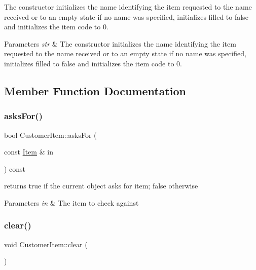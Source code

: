 The constructor initializes the name identifying the item requested to the name received or to an empty state if no name was specified, initializes filled to false and initializes the item code to 0. 
\begin{DoxyParams}{Parameters}
{\em str} & The constructor initializes the name identifying the item requested to the name received or to an empty state if no name was specified, initializes filled to false and initializes the item code to 0. \\
\hline
\end{DoxyParams}


\subsection{Member Function Documentation}
\mbox{\label{class_customer_item_a6275dac4b75e3cd8e56f504140cd135d}} 
\subsubsection{\texorpdfstring{asks\+For()}{asksFor()}}
{\footnotesize\ttfamily bool Customer\+Item\+::asks\+For (\begin{DoxyParamCaption}\item[{const \mbox{\hyperlink{class_item}{Item}} \&}]{in }\end{DoxyParamCaption}) const}

returns true if the current object asks for item; false otherwise 
\begin{DoxyParams}{Parameters}
{\em in} & The item to check against \\
\hline
\end{DoxyParams}
\mbox{\label{class_customer_item_af6a25490940dcac3842f877ea0da4580}} 
\subsubsection{\texorpdfstring{clear()}{clear()}}
{\footnotesize\ttfamily void Customer\+Item\+::clear (\begin{DoxyParamCaption}{ }\end{DoxyParamCaption})}

